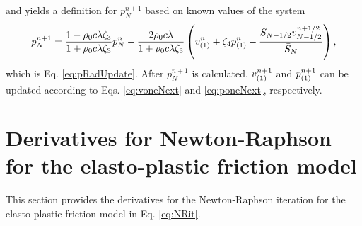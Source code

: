 and yields a definition for $p_N^{n+1}$ based on known values of the system
\begin{equation}\label{eq:pradApp}
    p_N^{n+1} = \frac{1 - \rho_0c\lambda\zeta_3}{1+\rho_0c\lambda\zeta_3}p_N^n - \frac{2\rho_0c\lambda}{1+\rho_0c\lambda\zeta_3} \left( v_{(1)}^n+\zeta_4p_{(1)}^n - \frac{S_{N-1/2}v_{N-1/2}^{n+1/2}}{\bar S_N}\right),
\end{equation}
which is Eq. \eqref{eq:pRadUpdate}. After $p_N^{n+1}$ is calculated, $v_{(1)}^{n+1}$ and $p_{(1)}^{n+1}$ can be updated according to Eqs. \eqref{eq:voneNext} and \eqref{eq:poneNext}, respectively.

\section{Derivatives for Newton-Raphson for the elasto-plastic friction model}\label{app:elastoDeriv}
This section provides the derivatives for the Newton-Raphson iteration for the elasto-plastic friction model in Eq. \eqref{eq:NRit}.

